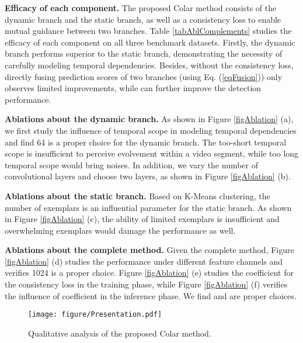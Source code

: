 \documentclass[10pt,twocolumn,letterpaper]{article}
\begin{document}
\textbf{Efficacy of each component.} The proposed Colar method consists of the dynamic branch and the static branch, as well as a consistency loss  to enable mutual guidance between two branches. Table \ref{tabAblComplements} studies the efficacy of each component on all three benchmark datasets. Firstly, the dynamic branch performs superior to the static branch, demonstrating the necessity of carefully modeling temporal dependencies. Besides, without the consistency loss, directly fusing prediction scores of two branches (\eg using Eq. (\ref{eqFusion})) only observes limited improvements, while  can further improve the detection performance.



\textbf{Ablations about the dynamic branch.} As shown in Figure \ref{figAblation} (a), we first study the influence of temporal scope  in modeling temporal dependencies and find 64 is a proper choice for the dynamic branch. The too-short temporal scope is insufficient to perceive evolvement within a video segment, while too long temporal scope would bring noises. In addition, we vary the number of convolutional layers and choose two layers, as shown in Figure \ref{figAblation} (b).

\textbf{Ablations about the static branch.} Based on K-Means clustering, the number of exemplars is an influential parameter for the static branch. As shown in Figure \ref{figAblation} (c), the ability of limited exemplars is insufficient and overwhelming exemplars would damage the performance as well.

\textbf{Ablations about the complete method.} Given the complete method, Figure \ref{figAblation} (d) studies the performance under different feature channels and verifies 1024 is a proper choice. Figure \ref{figAblation} (e) studies the coefficient  for the consistency loss in the training phase, while Figure \ref{figAblation} (f) verifies the influence of coefficient  in the inference phase. We find  and  are proper choices.


\begin{figure}[thbp]
\centering
\texttt{[image: figure/Presentation.pdf]}
\caption{Qualitative analysis of the proposed Colar method.}
\label{figVisualization}
\vspace{-0.3cm}
\end{figure}
\end{document}
